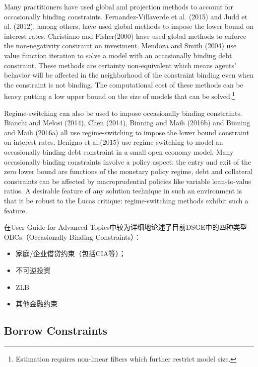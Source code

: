 \documentclass[cn,10pt,math=newtx,citestyle=gb7714-2015,bibstyle=gb7714-2015]{elegantbook}
\begin{document}
Many practitioners have used global and projection methods to account for occasionally binding constraints. Fernandez-Villaverde et al. (2015) and Judd et al. (2012), among others, have used global methods to impose the lower bound on interest rates. Christiano and Fisher(2000) have used global methods to enforce the non-negativity constraint on investment. Mendoza and Smith (2004) use value function iteration to solve a model with an occasionally binding debt constraint. These methods are certainty non-equivalent which means agents' behavior will be affected in the neighborhood of the constraint binding even when the constraint is not binding. The computational cost of these methods can be heavy putting a low upper bound on the size of models that can be solved.\footnote{Estimation requires non-linear filters which further restrict model size.}

Regime-switching can also be used to impose occasionally binding constraints. Bianchi and Melosi (2014), Chen (2014), Binning and Maih (2016b) and Binning and Maih (2016a) all use regime-switching to impose the lower bound constraint on interest rates. Benigno et al.(2015) use regime-switching to model an occasionally binding debt constraint in a small open economy model. Many occasionally binding constraints involve a policy aspect: the entry and exit of the zero lower bound are functions of the monetary policy regime, debt and collateral constraints can be affected by macroprudential policies like variable loan-to-value ratios. A desirable feature of any solution technique in such an environment is that it be robust to the Lucas critique: regime-switching methods exhibit such a feature.

在User Guide for Advanced Topics中较为详细地论述了目前DSGE中的四种类型OBCs（Occasionally Binding Constraints）：

\begin{itemize}
	\item 家庭/企业借贷约束（包括CIA等）；
	
	\item 不可逆投资
	
	\item ZLB
	
	\item 其他金融约束
\end{itemize}

\subsection{Borrow Constraints}
\end{document}
